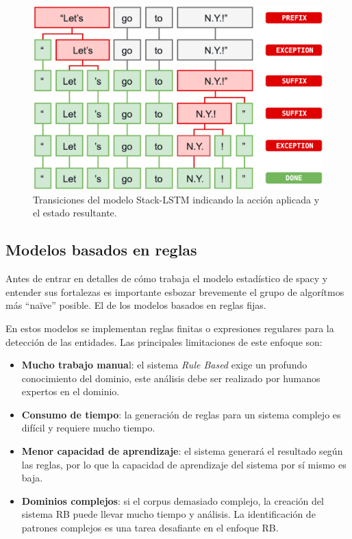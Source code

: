 \documentclass[12pt,a4paper,]{scrartcl}
\providecommand{\tightlist}{%
  \setlength{\itemsep}{0pt}\setlength{\parskip}{0pt}}
\begin{document}
\begin{figure}[H]

{\centering \includegraphics{assets/spacy_tokenization.pdf} 

}

\caption{Transiciones del modelo Stack-LSTM indicando la acción aplicada y el estado resultante.}\label{fig:spacy-tokenization}
\end{figure}

\hypertarget{modelos-basados-en-reglas}{%
\subsection{Modelos basados en reglas}\label{modelos-basados-en-reglas}}

Antes de entrar en detalles de cómo trabaja el modelo estadístico de spacy y entender sus fortalezas es importante esbozar brevemente el grupo de algorítmos más \enquote{naïve} posible. El de los modelos basados en reglas fijas.

En estos modelos se implementan reglas finitas o expresiones regulares para la detección de las entidades. Las principales limitaciones de este enfoque son:

\begin{itemize}
\tightlist
\item
  \textbf{Mucho trabajo manua}l: el sistema \emph{Rule Based} exige un profundo conocimiento del dominio, este análisis debe ser realizado por humanos expertos en el dominio.
\item
  \textbf{Consumo de tiempo}: la generación de reglas para un sistema complejo es difícil y requiere mucho tiempo.
\item
  \textbf{Menor capacidad de aprendizaje}: el sistema generará el resultado según las reglas, por lo que la capacidad de aprendizaje del sistema por sí mismo es baja.
\item
  \textbf{Dominios complejos}: si el corpus demasiado complejo, la creación del sistema RB puede llevar mucho tiempo y análisis. La identificación de patrones complejos es una tarea desafiante en el enfoque RB.
\end{itemize}
\end{document}
